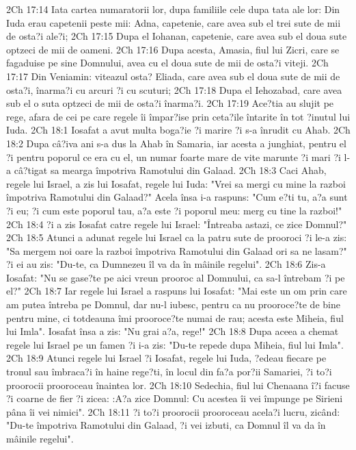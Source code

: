 2Ch 17:14  Iata cartea numaratorii lor, dupa familiile cele dupa tata ale lor: Din Iuda erau capetenii peste mii: Adna, capetenie, care avea sub el trei sute de mii de osta?i ale?i;
2Ch 17:15  Dupa el Iohanan, capetenie, care avea sub el doua sute optzeci de mii de oameni.
2Ch 17:16  Dupa acesta, Amasia, fiul lui Zicri, care se fagaduise pe sine Domnului, avea cu el doua sute de mii de osta?i viteji.
2Ch 17:17  Din Veniamin: viteazul osta? Eliada, care avea sub el doua sute de mii de osta?i, înarma?i cu arcuri ?i cu scuturi;
2Ch 17:18  Dupa el Iehozabad, care avea sub el o suta optzeci de mii de osta?i înarma?i.
2Ch 17:19  Ace?tia au slujit pe rege, afara de cei pe care regele îi împar?ise prin ceta?ile întarite în tot ?inutul lui Iuda.
2Ch 18:1  Iosafat a avut multa boga?ie ?i marire ?i s-a înrudit cu Ahab.
2Ch 18:2  Dupa câ?iva ani s-a dus la Ahab în Samaria, iar acesta a junghiat, pentru el ?i pentru poporul ce era cu el, un numar foarte mare de vite marunte ?i mari ?i l-a câ?tigat sa mearga împotriva Ramotului din Galaad.
2Ch 18:3  Caci Ahab, regele lui Israel, a zis lui Iosafat, regele lui Iuda: "Vrei sa mergi cu mine la razboi împotriva Ramotului din Galaad?" Acela însa i-a raspuns: "Cum e?ti tu, a?a sunt ?i eu; ?i cum este poporul tau, a?a este ?i poporul meu: merg cu tine la razboi!"
2Ch 18:4  ?i a zis Iosafat catre regele lui Israel: "Întreaba astazi, ce zice Domnul?"
2Ch 18:5  Atunci a adunat regele lui Israel ca la patru sute de prooroci ?i le-a zis: "Sa mergem noi oare la razboi împotriva Ramotului din Galaad ori sa ne lasam?" ?i ei au zis: "Du-te, ca Dumnezeu îl va da în mâinile regelui".
2Ch 18:6  Zis-a Iosafat: "Nu se gase?te pe aici vreun prooroc al Domnului, ca sa-l întrebam ?i pe el?"
2Ch 18:7  Iar regele lui Israel a raspuns lui Iosafat: "Mai este un om prin care am putea întreba pe Domnul, dar nu-l iubesc, pentru ca nu prooroce?te de bine pentru mine, ci totdeauna îmi prooroce?te numai de rau; acesta este Miheia, fiul lui Imla". Iosafat însa a zis: "Nu grai a?a, rege!"
2Ch 18:8  Dupa aceea a chemat regele lui Israel pe un famen ?i i-a zis: "Du-te repede dupa Miheia, fiul lui Imla".
2Ch 18:9  Atunci regele lui Israel ?i Iosafat, regele lui Iuda, ?edeau fiecare pe tronul sau îmbraca?i în haine rege?ti, în locul din fa?a por?ii Samariei, ?i to?i proorocii prooroceau înaintea lor.
2Ch 18:10  Sedechia, fiul lui Chenaana î?i facuse ?i coarne de fier ?i zicea: :A?a zice Domnul: Cu acestea îi vei împunge pe Sirieni pâna îi vei nimici".
2Ch 18:11  ?i to?i proorocii prooroceau acela?i lucru, zicând: "Du-te împotriva Ramotului din Galaad, ?i vei izbuti, ca Domnul îl va da în mâinile regelui".
